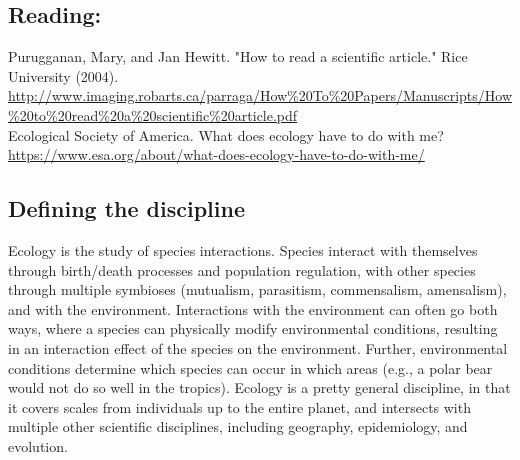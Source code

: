 \documentclass[12pt]{article}
\begin{document}
\subsection*{Reading:}

Purugganan, Mary, and Jan Hewitt. "How to read a scientific article." Rice University (2004). \url{http://www.imaging.robarts.ca/parraga/How%20To%20Papers/Manuscripts/How%20to%20read%20a%20scientific%20article.pdf} \\



Ecological Society of America. What does ecology have to do with me? \url{https://www.esa.org/about/what-does-ecology-have-to-do-with-me/}













\begin{center}
\noindent\hrulefill 
\end{center}



\clearpage





% 
% 









\subsection*{Defining the discipline}

Ecology is the study of species interactions. Species interact with themselves through birth/death processes and population regulation, with other species through multiple symbioses (mutualism, parasitism, commensalism, amensalism), and with the environment. Interactions with the environment can often go both ways, where a species can physically modify environmental conditions, resulting in an interaction effect of the species on the environment. Further, environmental conditions determine which species can occur in which areas (e.g., a polar bear would not do so well in the tropics). Ecology is a pretty general discipline, in that it covers scales from individuals up to the entire planet, and intersects with multiple other scientific disciplines, including geography, epidemiology, and evolution.
\end{document}
